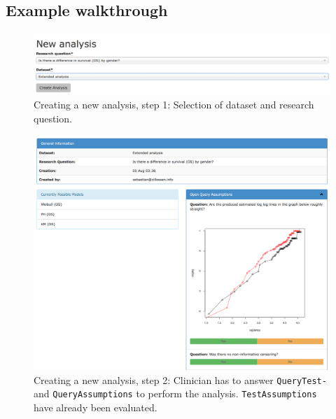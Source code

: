 \subsection{Example walkthrough}
\label{sub:walk}

\begin{figure}[h]
\centering
\includegraphics[width=\textwidth]{figures/ui_analysis_0}
\caption{Creating a new analysis, step 1: Selection of dataset and research question. }
\label{fig:analysis:1}
\end{figure}


\begin{figure}[h]
\centering
\includegraphics[width=\textwidth]{figures/ui_analysis_1}
\caption{Creating a new analysis, step 2: Clinician has to answer \texttt{QueryTest-} and \texttt{QueryAssumptions} to perform the analysis. \texttt{TestAssumptions} have already been evaluated.}
\label{fig:analysis:2}
\end{figure}

